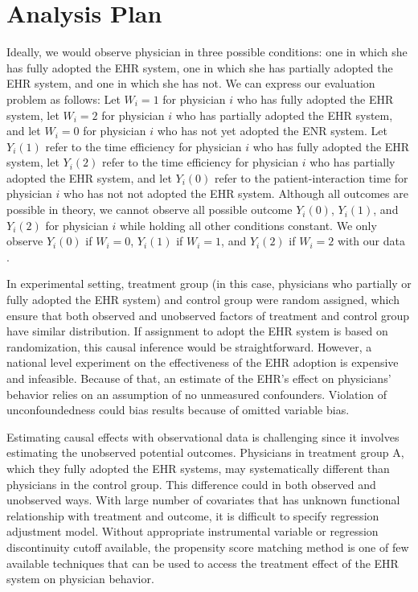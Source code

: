\section{Analysis Plan}
Ideally, we would observe physician in three possible conditions: one in which she has fully adopted the EHR system, one in which she has partially adopted the EHR system, and one in which she has not. We can express our evaluation problem as follows: Let $W_i = 1$ for physician $i$ who has fully adopted the EHR system, let $W_i = 2$ for physician $i$ who has partially adopted the EHR system, and let $W_i = 0$ for physician $i$ who has not yet adopted the ENR system. Let $Y_i(1)$ refer to the time efficiency for physician $i$ who has fully adopted the EHR system, let $Y_i(2)$ refer to the time efficiency for physician $i$ who has partially adopted the EHR system, and let $Y_i(0)$ refer to the patient-interaction time for physician $i$ who has not not adopted the EHR system. Although all outcomes are possible in theory, we cannot observe all possible outcome $Y_i(0)$, $Y_i(1)$, and $Y_i(2)$ for physician $i$ while holding all other conditions constant. We only observe $Y_i(0)$ if $W_i = 0$, $Y_i(1)$ if $W_i = 1$, and $Y_i(2)$ if $W_i = 2$ with our data \citep{imbens2008recent}.

In experimental setting, treatment group (in this case, physicians who partially or fully adopted the EHR system) and control group were random assigned, which ensure that both observed and unobserved factors of treatment and control group have similar distribution. If assignment to adopt the EHR system is based on randomization, this causal inference would be straightforward. However, a national level experiment on the effectiveness of the EHR adoption is expensive and infeasible. Because of that, an estimate of the EHR's effect on physicians' behavior relies on an assumption of no unmeasured confounders. Violation of unconfoundedness could bias results because of omitted variable bias.

Estimating causal effects with observational data is challenging since it involves estimating the unobserved potential outcomes. Physicians in treatment group A, which they fully adopted the EHR systems, may systematically different than physicians in the control group. This difference could in both observed and unobserved ways. With large number of covariates that has unknown functional relationship with treatment and outcome, it is difficult to specify regression adjustment model. Without appropriate instrumental variable or regression discontinuity cutoff available, the propensity score matching method is one of few available techniques that can be used to access the treatment effect of the EHR system on physician behavior.


